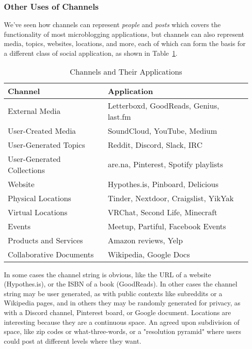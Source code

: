 \subsubsection{Other Uses of Channels}
We've seen how channels can represent \emph{people} and \emph{posts}
which covers the functionality of most microblogging applications,
but channels can also represent
media, topics, websites, locations, and more,
each of which can form the basis for a different class of
social application, as shown in Table~\ref{concepts:tab:channels}.

\begin{table}[h]
    \centering
    \begin{tabular}{|l|l|}
        \hline
        \textbf{Channel} & \textbf{Application} \\ \hline
        External Media & Letterboxd, GoodReads, Genius, last.fm \\ \hline
        User-Created Media & SoundCloud, YouTube, Medium \\ \hline
        User-Generated Topics & Reddit, Discord, Slack, IRC \\ \hline
        User-Generated Collections & are.na, Pinterest, Spotify playlists \\ \hline
        Website & Hypothes.is, Pinboard, Delicious \\ \hline
        Physical Locations & Tinder, Nextdoor, Craigslist, YikYak \\ \hline
        Virtual Locations & VRChat, Second Life, Minecraft \\ \hline
        Events & Meetup, Partiful, Facebook Events \\ \hline
        Products and Services & Amazon reviews, Yelp \\ \hline
        Collaborative Documents & Wikipedia, Google Docs \\ \hline
    \end{tabular}
    \caption{Channels and Their Applications}
    \label{concepts:tab:channels}
\end{table}

In some cases the channel string is obvious, like the URL of a website (Hypothes.is),
or the ISBN of a book (GoodReads).
In other cases the channel string may be user generated, as with
public contexts like subreddits or a Wikipedia pages,
and in others they may be randomly generated for privacy, as with
a Discord channel, Pinterest board, or Google document.
Locations are interesting because they are a continuous space.
An agreed upon subdivision of space, like zip codes or what-three-words,
or a "resolution pyramid" where users could post at different
levels where they want.


